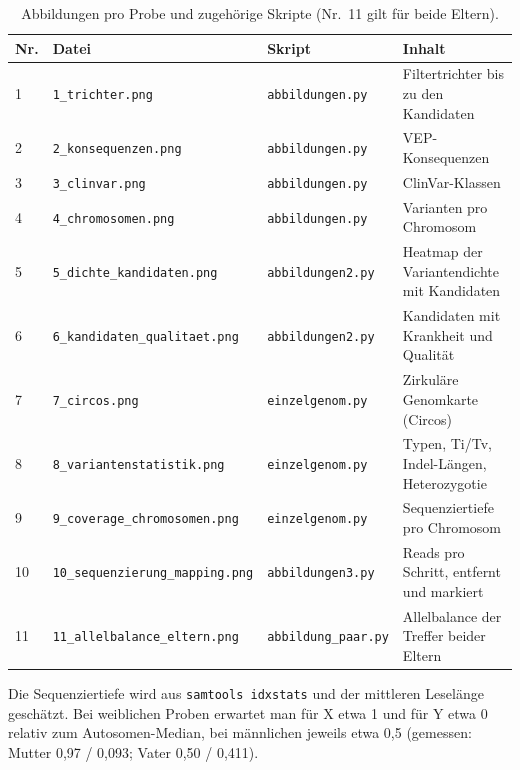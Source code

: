 \documentclass[10pt,a4paper,twocolumn]{article}
\begin{document}
\begin{table}[t]
\centering\small
\caption{Abbildungen pro Probe und zugehörige Skripte (Nr.~11 gilt für beide Eltern).}
\label{tab:abb}
\begin{tabular}{@{}p{0.8cm}p{5.2cm}p{3.2cm}p{7.0cm}@{}}
\toprule
Nr. & Datei & Skript & Inhalt\\
\midrule
1 & \texttt{1\_trichter.png} & \texttt{abbildungen.py} & Filtertrichter bis zu den Kandidaten\\
2 & \texttt{2\_konsequenzen.png} & \texttt{abbildungen.py} & VEP-Konsequenzen\\
3 & \texttt{3\_clinvar.png} & \texttt{abbildungen.py} & ClinVar-Klassen\\
4 & \texttt{4\_chromosomen.png} & \texttt{abbildungen.py} & Varianten pro Chromosom\\
5 & \texttt{5\_dichte\_kandidaten.png} & \texttt{abbildungen2.py} & Heatmap der Variantendichte mit Kandidaten\\
6 & \texttt{6\_kandidaten\_qualitaet.png} & \texttt{abbildungen2.py} & Kandidaten mit Krankheit und Qualität\\
7 & \texttt{7\_circos.png} & \texttt{einzelgenom.py} & Zirkuläre Genomkarte (Circos)\\
8 & \texttt{8\_variantenstatistik.png} & \texttt{einzelgenom.py} & Typen, Ti/Tv, Indel-Längen, Heterozygotie\\
9 & \texttt{9\_coverage\_chromosomen.png} & \texttt{einzelgenom.py} & Sequenziertiefe pro Chromosom\\
10 & \texttt{10\_sequenzierung\_mapping.png} & \texttt{abbildungen3.py} & Reads pro Schritt, entfernt und markiert\\
11 & \texttt{11\_allelbalance\_eltern.png} & \texttt{abbildung\_paar.py} & Allelbalance der Treffer beider Eltern\\
\bottomrule
\end{tabular}
\end{table}
 
Die Sequenziertiefe wird aus \texttt{samtools idxstats} und der mittleren Leselänge geschätzt. Bei weiblichen Proben erwartet man für X etwa 1 und für Y etwa 0 relativ zum Autosomen-Median, bei männlichen jeweils etwa 0,5 (gemessen: Mutter 0,97 / 0,093; Vater 0,50 / 0,411).
 
\end{document}
